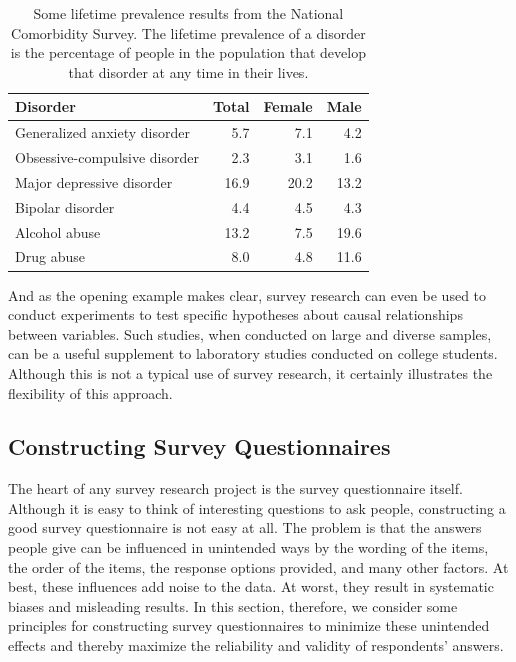 \documentclass[
]{krantz}
\begin{document}
\begin{table}

\caption{\label{tab:comorbidity}Some lifetime prevalence results from the National Comorbidity Survey. The lifetime prevalence of a disorder is the percentage of people in the population that develop that disorder at any time in their lives.}
\centering
\begin{tabular}[t]{l|r|r|r}
\hline
Disorder & Total & Female & Male\\
\hline
Generalized anxiety disorder & 5.7 & 7.1 & 4.2\\
\hline
Obsessive-compulsive disorder & 2.3 & 3.1 & 1.6\\
\hline
Major depressive disorder & 16.9 & 20.2 & 13.2\\
\hline
Bipolar disorder & 4.4 & 4.5 & 4.3\\
\hline
Alcohol abuse & 13.2 & 7.5 & 19.6\\
\hline
Drug abuse & 8.0 & 4.8 & 11.6\\
\hline
\end{tabular}
\end{table}

And as the opening example makes clear, survey research can even be used to conduct experiments to test specific hypotheses about causal relationships between variables. Such studies, when conducted on large and diverse samples, can be a useful supplement to laboratory studies conducted on college students. Although this is not a typical use of survey research, it certainly illustrates the flexibility of this approach.

\subsection*{Constructing Survey Questionnaires}\label{constructing-survey-questionnaires}


The heart of any survey research project is the survey questionnaire itself. Although it is easy to think of interesting questions to ask people, constructing a good survey questionnaire is not easy at all. The problem is that the answers people give can be influenced in unintended ways by the wording of the items, the order of the items, the response options provided, and many other factors. At best, these influences add noise to the data. At worst, they result in systematic biases and misleading results. In this section, therefore, we consider some principles for constructing survey questionnaires to minimize these unintended effects and thereby maximize the reliability and validity of respondents' answers.
\end{document}
